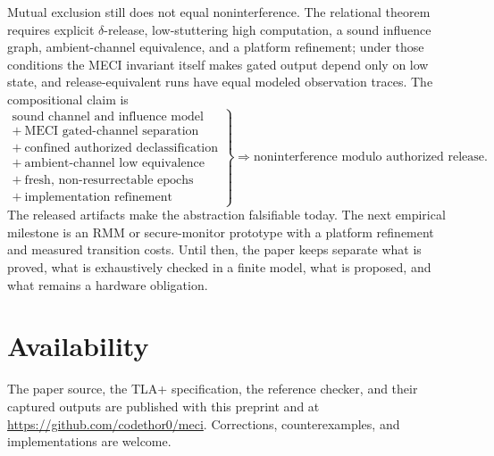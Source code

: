\documentclass[11pt,letterpaper]{article}
\theoremstyle{plain}
\theoremstyle{definition}
\begin{document}
Mutual exclusion still does not equal noninterference. The relational theorem requires explicit $\delta$-release, low-stuttering high computation, a sound influence graph, ambient-channel equivalence, and a platform refinement; under those conditions the MECI invariant itself makes gated output depend only on low state, and release-equivalent runs have equal modeled observation traces. The compositional claim is
\begin{equation}
\left.
\begin{array}{l}
\text{sound channel and influence model}\\
+\ \text{MECI gated-channel separation}\\
+\ \text{confined authorized declassification}\\
+\ \text{ambient-channel low equivalence}\\
+\ \text{fresh, non-resurrectable epochs}\\
+\ \text{implementation refinement}
\end{array}
\right\}
\Longrightarrow \text{noninterference modulo authorized release.}
\end{equation}
The released artifacts make the abstraction falsifiable today. The next empirical milestone is an RMM or secure-monitor prototype with a platform refinement and measured transition costs. Until then, the paper keeps separate what is proved, what is exhaustively checked in a finite model, what is proposed, and what remains a hardware obligation.

\section*{Availability}

The paper source, the TLA+ specification, the reference checker, and their captured outputs are published with this preprint and at \url{https://github.com/codethor0/meci}. Corrections, counterexamples, and implementations are welcome.
\end{document}
